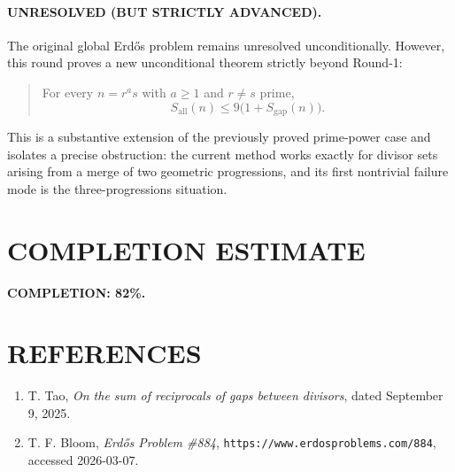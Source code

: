 \paragraph{\textbf{UNRESOLVED (BUT STRICTLY ADVANCED).}}

The original global Erd\H{o}s problem remains unresolved unconditionally. However, this round proves a new unconditional theorem strictly beyond Round-1:

\begin{quote}
For every \(n=r^a s\) with \(a\geq 1\) and \(r\neq s\) prime,
\[
S_{\mathrm{all}}(n)\leq 9\bigl(1+S_{\mathrm{gap}}(n)\bigr).
\]
\end{quote}

This is a substantive extension of the previously proved prime-power case and isolates a precise obstruction: the current method works exactly for divisor sets arising from a merge of two geometric progressions, and its first nontrivial failure mode is the three-progressions situation.

\section{COMPLETION ESTIMATE}

\noindent \textbf{COMPLETION: 82\%.}

\section{REFERENCES}

\begin{enumerate}
\item T. Tao, \emph{On the sum of reciprocals of gaps between divisors}, dated September 9, 2025.
\item T. F. Bloom, \emph{Erd\H{o}s Problem \#884}, \texttt{https://www.erdosproblems.com/884}, accessed 2026-03-07.
\end{enumerate}
